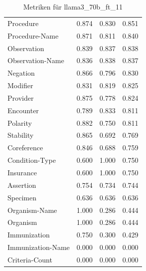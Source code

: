 \begin{table}[htbp]
\begin{tabular}{p{5cm}ccc}
Procedure & 0.874 & 0.830 & 0.851 \\
Procedure-Name & 0.871 & 0.811 & 0.840 \\
Observation & 0.839 & 0.837 & 0.838 \\
Observation-Name & 0.836 & 0.838 & 0.837 \\
Negation & 0.866 & 0.796 & 0.830 \\
Modifier & 0.831 & 0.819 & 0.825 \\
Provider & 0.875 & 0.778 & 0.824 \\
Encounter & 0.789 & 0.833 & 0.811 \\
Polarity & 0.882 & 0.750 & 0.811 \\
Stability & 0.865 & 0.692 & 0.769 \\
Coreference & 0.846 & 0.688 & 0.759 \\
Condition-Type & 0.600 & 1.000 & 0.750 \\
Insurance & 0.600 & 1.000 & 0.750 \\
Assertion & 0.754 & 0.734 & 0.744 \\
Specimen & 0.636 & 0.636 & 0.636 \\
Organism-Name & 1.000 & 0.286 & 0.444 \\
Organism & 1.000 & 0.286 & 0.444 \\
Immunization & 0.750 & 0.300 & 0.429 \\
Immunization-Name & 0.000 & 0.000 & 0.000 \\
Criteria-Count & 0.000 & 0.000 & 0.000 \\
\bottomrule
\end{tabular}
\caption{Metriken für llama3_70b_ft_11}
\label{tab:metrics_llama3_70b_ft_11}
\end{table}